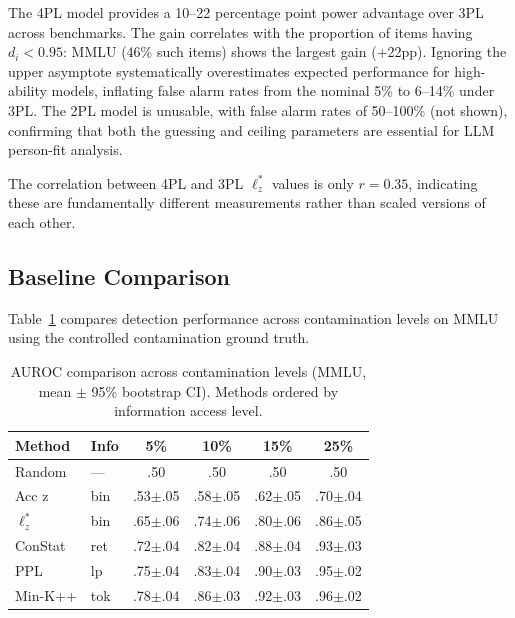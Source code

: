 \documentclass[11pt,a4paper]{article}
\begin{document}
The 4PL model provides a 10--22 percentage point power advantage over 3PL across benchmarks.
The gain correlates with the proportion of items having $d_i < 0.95$: MMLU (46\% such items) shows the largest gain (+22pp).
Ignoring the upper asymptote systematically overestimates expected performance for high-ability models, inflating false alarm rates from the nominal 5\% to 6--14\% under 3PL.
The 2PL model is unusable, with false alarm rates of 50--100\% (not shown), confirming that both the guessing and ceiling parameters are essential for LLM person-fit analysis.

The correlation between 4PL and 3PL $\ell_z^*$ values is only $r=0.35$, indicating these are fundamentally different measurements rather than scaled versions of each other.

\subsection{Baseline Comparison}
\label{sec:baselines}

Table~\ref{tab:baselines} compares detection performance across contamination levels on MMLU using the controlled contamination ground truth.

\begin{table}[t]
\centering
\caption{AUROC comparison across contamination levels (MMLU, mean $\pm$ 95\% bootstrap CI). Methods ordered by information access level.}
\label{tab:baselines}
\small
\begin{tabular}{llcccc}
\toprule
Method & Info & 5\% & 10\% & 15\% & 25\% \\
\midrule
Random & --- & .50 & .50 & .50 & .50 \\
Acc z & bin & .53{\scriptsize$\pm$.05} & .58{\scriptsize$\pm$.05} & .62{\scriptsize$\pm$.05} & .70{\scriptsize$\pm$.04} \\
$\ell_z^*$ & bin & .65{\scriptsize$\pm$.06} & .74{\scriptsize$\pm$.06} & .80{\scriptsize$\pm$.06} & .86{\scriptsize$\pm$.05} \\
ConStat & ret & .72{\scriptsize$\pm$.04} & .82{\scriptsize$\pm$.04} & .88{\scriptsize$\pm$.04} & .93{\scriptsize$\pm$.03} \\
PPL & lp & .75{\scriptsize$\pm$.04} & .83{\scriptsize$\pm$.04} & .90{\scriptsize$\pm$.03} & .95{\scriptsize$\pm$.02} \\
Min-K++ & tok & .78{\scriptsize$\pm$.04} & .86{\scriptsize$\pm$.03} & .92{\scriptsize$\pm$.03} & .96{\scriptsize$\pm$.02} \\
\bottomrule
\end{tabular}
\end{table}
\end{document}
